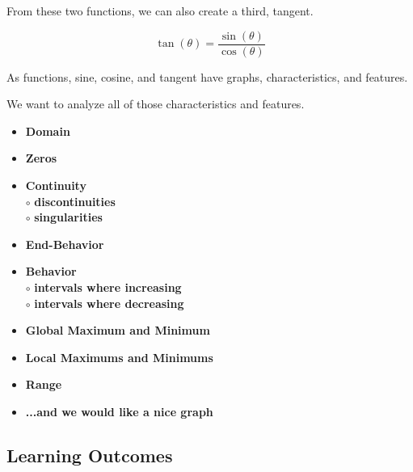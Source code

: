 \documentclass{ximera}
\begin{document}
From these two functions, we can also create a third, tangent.

\[       
\tan(\theta) = \frac{\sin(\theta)}{\cos(\theta)}
\]



As functions, sine, cosine, and tangent have graphs, characteristics, and features.


We want to analyze all of those characteristics and features.



\begin{itemize}
     \item \textbf{\textcolor{red!70!black}{Domain}} 
     \item \textbf{\textcolor{red!70!black}{Zeros}} 
     \item \textbf{\textcolor{red!70!black}{Continuity}} \\
     \text{    }$\circ$ \textbf{\textcolor{purple!85!blue}{discontinuities}}\\
     \text{    }$\circ$ \textbf{\textcolor{purple!85!blue}{singularities}}\\
     \item \textbf{\textcolor{red!70!black}{End-Behavior}} 
     \item \textbf{\textcolor{red!70!black}{Behavior}} \\
     \text{    }$\circ$ \textbf{\textcolor{purple!85!blue}{intervals where increasing}}\\
     \text{    }$\circ$ \textbf{\textcolor{purple!85!blue}{intervals where decreasing}}\\
     \item \textbf{\textcolor{red!70!black}{Global Maximum and Minimum}} 
     \item \textbf{\textcolor{red!70!black}{Local Maximums and Minimums}} 
     \item \textbf{\textcolor{red!70!black}{Range}} 
     \item \textbf{\textcolor{blue!55!black}{...and we would like a nice graph}} 
\end{itemize}
















\subsection*{Learning Outcomes}
\end{document}
